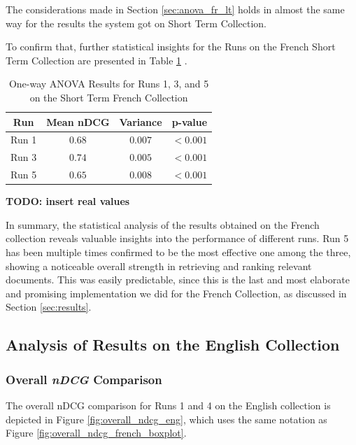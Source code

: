The considerations made in Section \ref{sec:anova_fr_lt} holds in almost the same way for the results the system got on Short Term Collection.  

To confirm that, further statistical insights for the Runs on the French Short Term Collection are presented in Table \ref{table:st_anova_french} .

\begin{table}[!h]
\centering
\caption{One-way \ac{ANOVA} Results for Runs 1, 3, and 5 on the Short Term French Collection}
\label{table:st_anova_french}
\begin{tabular}{cccc}
\toprule
\textbf{Run} & \textbf{Mean nDCG} & \textbf{Variance} & \textbf{p-value} \\
\midrule
Run 1 & $0.68$ & $0.007$ & $<0.001$ \\
Run 3 & $0.74$ & $0.005$ & $<0.001$ \\
Run 5 & $0.65$ & $0.008$ & $<0.001$ \\
\bottomrule
\end{tabular}
\end{table}
\begin{center}
    \textbf{TODO: insert real values}
\end{center}

In summary, the statistical analysis of the results obtained on the French collection reveals valuable insights into the performance of different runs. 
Run 5 has been multiple times confirmed to be the most effective one among the three, showing a noticeable overall strength in retrieving and ranking relevant documents.
This was easily predictable, since this is the last and most elaborate and promising implementation we did for the French Collection, as discussed in Section \ref{sec:results}.   


\subsection{Analysis of Results on the English Collection}

\subsubsection{Overall \textit{nDCG} Comparison} \label{sec:ndcg_comparison_eng}

The overall \ac{nDCG} comparison for Runs 1 and 4 on the English collection is depicted in Figure \ref{fig:overall_ndcg_eng}, which uses the same notation as Figure \ref{fig:overall_ndcg_french_boxplot}.

